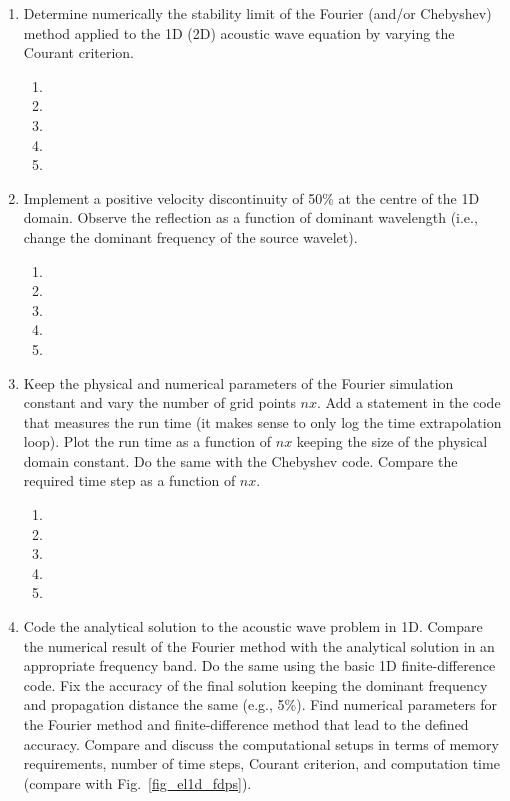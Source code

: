 \begin{enumerate}
\begin{enumerate}
\item[]
\item[]
\item[] 
\item[]
\item[] 
\end{enumerate}
\item
Determine numerically the stability limit of the Fourier (and/or Chebyshev) method applied to the 1D (2D) acoustic wave equation by varying the Courant criterion. 
\begin{enumerate}
\item[]
\item[]
\item[] 
\item[]
\item[] 
\end{enumerate}
\item
Implement a positive velocity discontinuity of 50\% at the centre of the 1D domain. Observe the reflection as a function of dominant wavelength (i.e., change the dominant frequency of the source wavelet). 
\begin{enumerate}
\item[]
\item[]
\item[] 
\item[]
\item[] 
\end{enumerate}
\item
Keep the physical and numerical parameters of the Fourier simulation constant and vary the number of grid points $nx$. Add a statement in  the code that measures the run time  (it makes sense to only log the time extrapolation loop). Plot the run time as a function of $nx$ keeping the size of the physical domain constant. Do the same with the Chebyshev code. Compare the required time step as a function of $nx$. 
\begin{enumerate}
\item[]
\item[]
\item[] 
\item[]
\item[] 
\end{enumerate}
\item
Code the analytical solution to the acoustic wave problem in 1D. Compare the numerical result of the Fourier method with the analytical solution in an appropriate frequency band. Do the same using the basic 1D finite-difference code. Fix the accuracy of the final solution keeping the dominant frequency and propagation distance the same (e.g., 5\%). Find numerical  parameters for the Fourier method and  finite-difference method that lead to the defined accuracy. Compare and discuss the computational setups in terms of memory requirements, number of time steps, Courant criterion, and computation time (compare with Fig.~\ref{fig_el1d_fdps}).

\end{enumerate}
